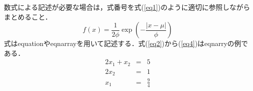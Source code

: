 数式による記述が必要な場合は，式番号を式(\ref{eq1})のように適切に参照しながらまとめること．
\begin{equation}
  \label{eq1}
  f(x) = \frac{1}{2 \phi} \exp \left( - \frac{ | x - \mu | }{\phi}  \right)
\end{equation}
式はequationやeqnarrayを用いて記述する．式(\ref{eq2})から(\ref{eq4})はeqnarryの例である．
\begin{eqnarray}
  \label{eq2}
  2x_1 + x_2 & = & 5 \\
  \label{eq3}
  2x_2 & = & 1 \\
  \label{eq4}
  x_1 & = & \frac{9}{4}
\end{eqnarray}

